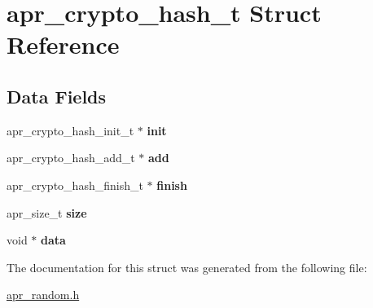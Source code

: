 \hypertarget{structapr__crypto__hash__t}{}\section{apr\+\_\+crypto\+\_\+hash\+\_\+t Struct Reference}
\label{structapr__crypto__hash__t}
\subsection*{Data Fields}
\begin{DoxyCompactItemize}
\item 
apr\+\_\+crypto\+\_\+hash\+\_\+init\+\_\+t $\ast$ {\bfseries init}\hypertarget{structapr__crypto__hash__t_a3b0a8b85bc2207235024a9e64febab69}{}\label{structapr__crypto__hash__t_a3b0a8b85bc2207235024a9e64febab69}

\item 
apr\+\_\+crypto\+\_\+hash\+\_\+add\+\_\+t $\ast$ {\bfseries add}\hypertarget{structapr__crypto__hash__t_a60c77281aca26fdb500c3ef899908abb}{}\label{structapr__crypto__hash__t_a60c77281aca26fdb500c3ef899908abb}

\item 
apr\+\_\+crypto\+\_\+hash\+\_\+finish\+\_\+t $\ast$ {\bfseries finish}\hypertarget{structapr__crypto__hash__t_abd6933f64b61c595788ddf0f16d5b48c}{}\label{structapr__crypto__hash__t_abd6933f64b61c595788ddf0f16d5b48c}

\item 
apr\+\_\+size\+\_\+t {\bfseries size}\hypertarget{structapr__crypto__hash__t_ade59f47b349e3a9eef98097fb87fbf72}{}\label{structapr__crypto__hash__t_ade59f47b349e3a9eef98097fb87fbf72}

\item 
void $\ast$ {\bfseries data}\hypertarget{structapr__crypto__hash__t_a0211f5be5ddce65dee1ea0720d39e8e3}{}\label{structapr__crypto__hash__t_a0211f5be5ddce65dee1ea0720d39e8e3}

\end{DoxyCompactItemize}


The documentation for this struct was generated from the following file\+:\begin{DoxyCompactItemize}
\item 
\hyperlink{apr__random_8h}{apr\+\_\+random.\+h}\end{DoxyCompactItemize}
